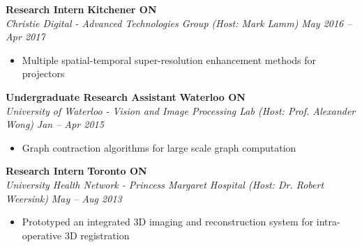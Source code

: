       \vspace{\interlist}
      \textbf{Research Intern}
      \hfill
      \textbf{Kitchener ON}\\
      \textit{Christie Digital - Advanced Technologies Group (Host: Mark Lamm)}
      \hfill
      \textit{May 2016 -- Apr 2017}
      \begin{itemize}
        \setlength\itemsep{0.2em}
        \item Multiple spatial-temporal super-resolution enhancement methods for projectors
      \end{itemize}
      \vspace{\interlist}
      \textbf{Undergraduate Research Assistant}
      \hfill
      \textbf{Waterloo ON}\\
      \textit{University of Waterloo - Vision and Image Processing Lab (Host: Prof. Alexander Wong)}
      \hfill
      \textit{Jan -- Apr 2015}
      \begin{itemize}
        \setlength\itemsep{0.2em}
        \item Graph contraction algorithms for large scale graph computation
      \end{itemize}
      \vspace{\interlist}
      \textbf{Research Intern}
      \hfill
      \textbf{Toronto ON}\\
      \textit{University Health Network - Princess Margaret Hospital (Host: Dr. Robert Weersink)}
      \hfill
      \textit{May -- Aug 2013}
      \begin{itemize}
        \setlength\itemsep{0.2em}
        \item Prototyped an integrated 3D imaging and reconstruction system for intra-operative 3D registration
      \end{itemize}
      \vspace{\interlist}
